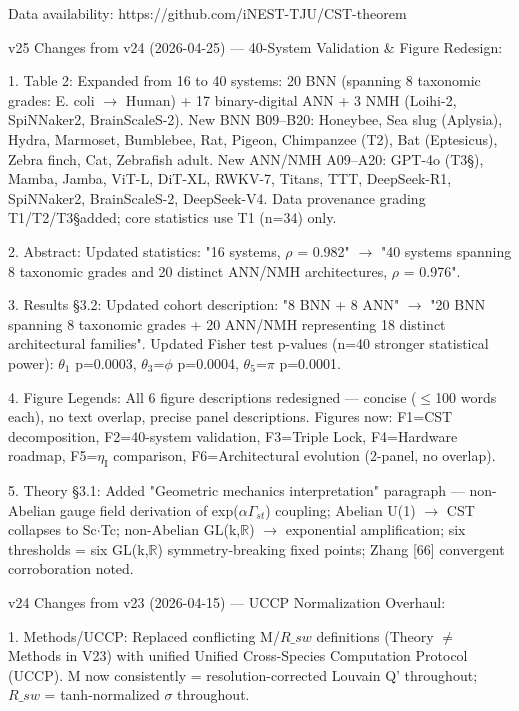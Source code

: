 \documentclass[a4paper,12pt]{article}
\providecommand{\textsubscript}[1]{\ensuremath{_{\text{#1}}}}
\begin{document}
Data availability: https://github.com/iNEST-TJU/CST-theorem

v25 Changes from v24 (2026-04-25) --- 40-System Validation \& Figure Redesign:

1.
Table 2: Expanded from 16 to 40 systems: 20 BNN (spanning 8 taxonomic grades: E. coli $\rightarrow$ Human) + 17 binary-digital ANN + 3 NMH (Loihi-2, SpiNNaker2, BrainScaleS-2).
New BNN B09--B20: Honeybee, Sea slug (Aplysia), Hydra, Marmoset, Bumblebee, Rat, Pigeon, Chimpanzee (T2\dag), Bat (Eptesicus), Zebra finch, Cat, Zebrafish adult.
New ANN/NMH A09--A20: GPT-4o (T3\S), Mamba, Jamba, ViT-L, DiT-XL, RWKV-7, Titans, TTT, DeepSeek-R1, SpiNNaker2, BrainScaleS-2, DeepSeek-V4.
Data provenance grading T1/T2\dag/T3\S added; core statistics use T1 (n=34) only.

2. Abstract: Updated statistics: "16 systems, $\rho$ = 0.982" $\rightarrow$ "40 systems spanning 8 taxonomic grades and 20 distinct ANN/NMH architectures, $\rho$ = 0.976".

3. Results \S3.2: Updated cohort description: "8 BNN + 8 ANN" $\rightarrow$ "20 BNN spanning 8 taxonomic grades + 20 ANN/NMH representing 18 distinct architectural families". Updated Fisher test p-values (n=40 stronger statistical power): $\theta$\textsubscript{1} p=0.0003, $\theta$\textsubscript{3}=$\phi$ p=0.0004, $\theta$\textsubscript{5}=$\pi$ p=0.0001.

4. Figure Legends: All 6 figure descriptions redesigned --- concise ($\leq$100 words each), no text overlap, precise panel descriptions. Figures now: F1=CST decomposition, F2=40-system validation, F3=Triple Lock, F4=Hardware roadmap, F5=$\eta_{\text{I}}$ comparison, F6=Architectural evolution (2-panel, no overlap).

5. Theory \S3.1: Added "Geometric mechanics interpretation" paragraph --- non-Abelian gauge field derivation of exp($\alpha$\cdot$\Gamma_{st}$) coupling; Abelian U(1) $\rightarrow$ CST collapses to Sc$\cdot$Tc; non-Abelian GL(k,$\mathbb{R}$) $\rightarrow$ exponential amplification; six thresholds = six GL(k,$\mathbb{R}$) symmetry-breaking fixed points; Zhang [66] convergent corroboration noted.

v24 Changes from v23 (2026-04-15) --- UCCP Normalization Overhaul:

1. Methods/UCCP: Replaced conflicting M/$R\_{sw}$ definitions (Theory $\neq$ Methods in V23) with unified Unified Cross-Species Computation Protocol (UCCP). M now consistently = resolution-corrected Louvain Q' throughout; $R\_{sw}$ = tanh-normalized $\sigma$ throughout.
\end{document}
